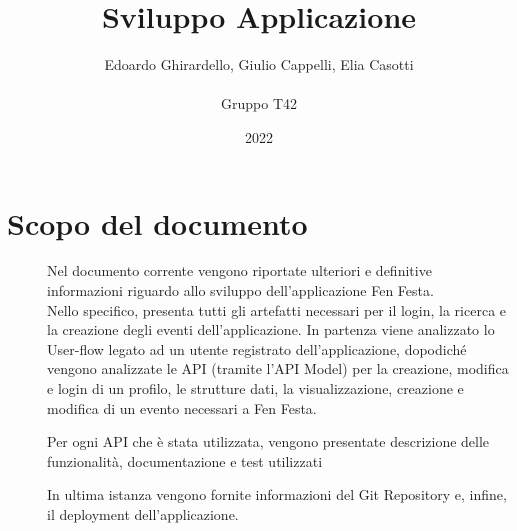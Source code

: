 \documentclass{article}
\title{\textbf{\Huge Sviluppo Applicazione}}
\author{Edoardo Ghirardello, Giulio Cappelli, Elia Casotti \\ \\ Gruppo T42}
\date{2022}
\begin{document}
\maketitle

\clearpage
\tableofcontents
\clearpage

\section{Scopo del documento}
\begin{description}
    \item[] Nel documento corrente vengono riportate ulteriori e definitive informazioni riguardo allo sviluppo dell'applicazione Fen Festa.
        \\ Nello specifico, presenta tutti gli artefatti necessari per il login, la ricerca e la creazione degli eventi dell'applicazione. In partenza viene analizzato lo User-flow legato ad un utente registrato dell'applicazione, dopodiché vengono analizzate le API (tramite l'API Model) per la creazione, modifica e login di un profilo, le strutture dati, la visualizzazione, creazione e modifica di un evento necessari a Fen Festa.
    \item[] Per ogni API che è stata utilizzata, vengono presentate descrizione delle funzionalità, documentazione e test utilizzati
    \item[] In ultima istanza vengono fornite informazioni del Git Repository e, infine, il deployment dell'applicazione.
\end{description}
\clearpage
\end{document}

